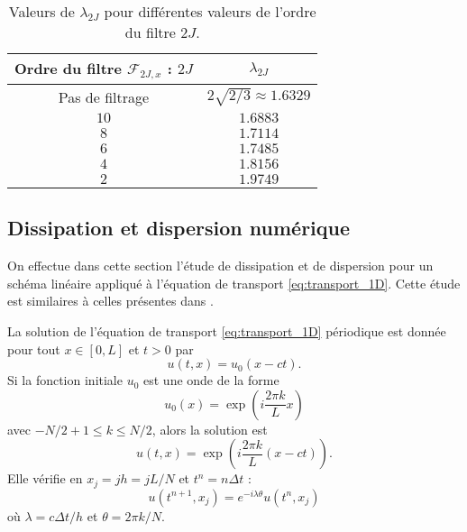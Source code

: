 \begin{table}[htbp]
\begin{center}
\begin{tabular}{|c|c|}
\hline
\textbf{Ordre du filtre} $\mathcal{F}_{2J,x}$ : $2J$ & $\lambda_{2J}$ \\
\hline
\hline
Pas de filtrage & $2 \sqrt{2/3} \approx 1.6329$ \\
$10$ & $1.6883$ \\
$ 8$ & $1.7114$ \\
$ 6$ & $1.7485$ \\
$ 4$ & $1.8156$ \\
$ 2$ & $1.9749$ \\
\hline
\end{tabular}
\end{center}
\caption{Valeurs de $\lambda_{2J}$ pour différentes valeurs de l'ordre du filtre $2J$.}
\label{tab:cfl_adv1d}
\end{table}













\subsection{Dissipation et dispersion numérique}

On effectue dans cette section l'étude de dissipation et de dispersion pour un schéma linéaire appliqué à l'équation de transport \eqref{eq:transport_1D}. Cette étude est similaires à celles présentes dans \cite{Desquesnes2007, Dubois2016}.

La solution de l'équation de transport \eqref{eq:transport_1D} périodique est donnée pour tout $x \in [0,L]$ et $t>0$ par
\begin{equation}
u(t,x)=u_0(x-ct).
\end{equation}
Si la fonction initiale $u_0$ est une onde de la forme 
\begin{equation}
u_0(x) = \exp \left( i \dfrac{2 \pi k}{L} x \right)
\end{equation}
avec $-N/2 +1 \leq k \leq N/2 $, alors la solution est
\begin{equation}
u(t,x) = \exp \left( i \dfrac{2 \pi k}{L} (x-ct) \right).
\end{equation}
Elle vérifie en $x_j = j h = j L/N$ et $t^n = n \Delta t$ :
\begin{equation}
u(t^{n+1},x_j) = e^{-i \lambda \theta} u(t^n,x_j)
\label{eq:e(ilambdateta)}
\end{equation}
où $\lambda = c \Delta t /h$ et $\theta = 2 \pi k / N$.

